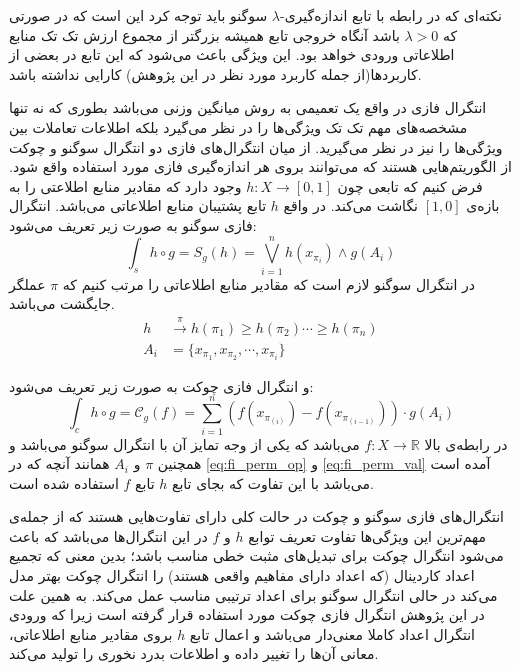 نکته‌ای که در رابطه با تابع اندازه‌گیری-$\lambda$ سوگنو باید توجه کرد این است که در صورتی که $\lambda > 0$ باشد آنگاه خروجی تابع همیشه بزرگتر از مجموع ارزش تک تک منابع اطلاعاتی ورودی خواهد بود. این ویژگی باعث می‌شود که این تابع در بعضی از کاربردها(از جمله کاربرد مورد نظر در این پژوهش) کارایی نداشته باشد.

انتگرال فازی در واقع یک تعمیمی به روش میانگین وزنی می‌باشد بطوری که نه تنها مشخصه‌های مهم تک تک ویژگی‌ها را در نظر می‌گیرد بلکه اطلاعات تعاملات بین ویژگی‌ها را نیز در نظر می‌گیرید. از میان انتگرال‌های فازی دو انتگرال سوگنو و چوکت از الگوریتم‌هایی هستند که می‌توانند بروی هر اندازه‌گیری‌ فازی مورد استفاده واقع شود. فرض کنیم که تابعی چون
$h : X \rightarrow [0, 1]$
وجود دارد که مقادیر منابع اطلاعتی را به بازه‌ی $[1, 0]$ نگاشت می‌کند. در واقع $h$ تابع پشتیبان منابع اطلاعاتی می‌باشد. انتگرال فازی سوگنو به صورت زیر تعریف می‌شود:
\begin{equation}\label{eq:sugeno_integral}
\int_{s} h \circ g = S_g(h) = \bigvee_{i=1}^{n} h(x_{\pi_i}) \wedge g(A_i)
\end{equation}
در انتگرال‌ سوگنو لازم است که مقادیر منابع اطلاعاتی را مرتب کنیم که $\pi$ عملگر جایگشت می‌باشد.
\begin{align}
h &\xrightarrow{\pi} h(\pi_1) \geq h(\pi_2) \cdots \geq h(\pi_n)\label{eq:fi_perm_op}\\
A_i &= \{x_{\pi_1}, x_{\pi_2}, \cdots, x_{\pi_i}\}\label{eq:fi_perm_val}
\end{align}

و انتگرال فازی چوکت به صورت زیر تعریف می‌شود:
\begin{equation}\label{eq:choquet_integral}
\int_{c} h \circ g = \mathcal{C}_g(f) = \sum_{i = 1}^{n} \left( f(x_{\pi_{(i)}}) - f(x_{\pi_{(i-1)}}) \right) \cdot g(A_i)
\end{equation}
در رابطه‌ی بالا
$f : X \rightarrow \mathbb{R}$
می‌باشد که یکی از وجه تمایز آن با انتگرال سوگنو می‌‌باشد و همچنین $\pi$ و $A_i$ همانند آنچه که در
\ref{eq:fi_perm_op} و \ref{eq:fi_perm_val}
آمده است می‌باشد با این تفاوت که بجای تابع $h$ تابع $f$ استفاده شده است.

انتگرال‌های فازی سوگنو و چوکت در حالت کلی دارای تفاوت‌هایی هستند که از جمله‌ی مهم‌ترین این ویژگی‌ها تفاوت تعریف توابع $h$ و $f$ در این انتگرال‌ها می‌باشد که باعث می‌شود انتگرال چوکت برای تبدیل‌های مثبت خطی مناسب باشد؛ بدین معنی که تجمیع اعداد کاردینال (که اعداد دارای مفاهیم واقعی هستند) را انتگرال چوکت بهتر مدل می‌کند در حالی انتگرال سوگنو برای اعداد ترتیبی مناسب عمل می‌کند. به همین علت در این پژوهش انتگرال فازی چوکت مورد استفاده قرار گرفته است زیرا که ورودی انتگرال اعداد کاملا معنی‌دار می‌باشد و اعمال تابع $h$ بروی مقادیر منابع اطلاعاتی، معانی آن‌ها را تغییر داده و اطلاعات بدرد نخوری را تولید می‌کند.